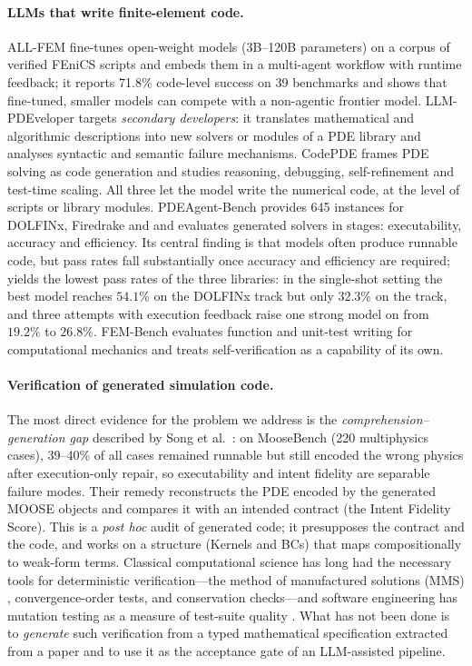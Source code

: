 \paragraph{LLMs that write finite-element code.}
ALL-FEM \citep{allfem2026} fine-tunes open-weight models (3B--120B parameters) on a corpus of verified FEniCS scripts and embeds them in a multi-agent workflow with runtime feedback; it reports 71.8\% code-level success on 39 benchmarks and shows that fine-tuned, smaller models can compete with a non-agentic frontier model. LLM-PDEveloper \citep{pdeveloper2025} targets \emph{secondary developers}: it translates mathematical and algorithmic descriptions into new solvers or modules of a PDE library and analyses syntactic and semantic failure mechanisms. CodePDE \citep{codepde2025} frames PDE solving as code generation and studies reasoning, debugging, self-refinement and test-time scaling. All three let the model write the numerical code, at the level of scripts or library modules. PDEAgent-Bench \citep{pdeagentbench2026} provides 645 instances for DOLFINx, Firedrake and \dealii{} and evaluates generated solvers in stages: executability, accuracy and efficiency. Its central finding is that models often produce runnable code, but pass rates fall substantially once accuracy and efficiency are required; \dealii{} yields the lowest pass rates of the three libraries: in the single-shot setting the best model reaches $54.1\%$ on the DOLFINx track but only $32.3\%$ on the \dealii{} track, and three attempts with execution feedback raise one strong model on \dealii{} from $19.2\%$ to $26.8\%$. FEM-Bench \citep{fembench2025} evaluates function and unit-test writing for computational mechanics and treats self-verification as a capability of its own.

\paragraph{Verification of generated simulation code.}
The most direct evidence for the problem we address is the \emph{comprehension--generation gap} described by Song et al.\ \citep{wrongphysics2026}: on MooseBench (220 multiphysics cases), 39--40\% of all cases remained runnable but still encoded the wrong physics after execution-only repair, so executability and intent fidelity are separable failure modes. Their remedy reconstructs the PDE encoded by the generated MOOSE objects and compares it with an intended contract (the Intent Fidelity Score). This is a \emph{post hoc} audit of generated code; it presupposes the contract and the code, and works on a structure (Kernels and BCs) that maps compositionally to weak-form terms. Classical computational science has long had the necessary tools for deterministic verification---the method of manufactured solutions (MMS) \citep{roache1998,salari2000,oberkampf2010}, convergence-order tests, and conservation checks---and software engineering has mutation testing as a measure of test-suite quality \citep{demillo1978,jia2011}. What has not been done is to \emph{generate} such verification from a typed mathematical specification extracted from a paper and to use it as the acceptance gate of an LLM-assisted pipeline.

